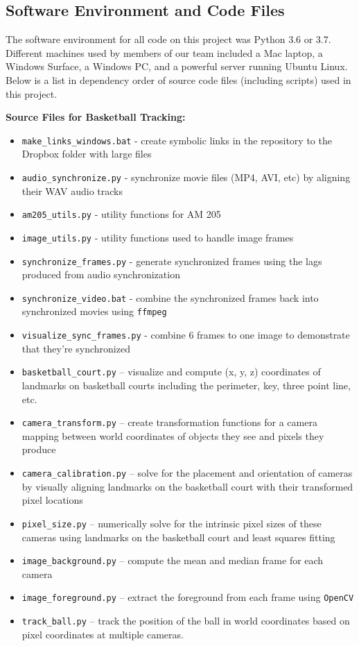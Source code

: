 \documentclass{article}
\begin{document}
\newpage
\subsection{Software Environment and Code Files}
The software environment for all code on this project was Python 3.6 or 3.7.
Different machines used by members of our team included a Mac laptop, a Windows Surface, 
a Windows PC, and a powerful server running Ubuntu Linux.  
Below is a list in dependency order of source code files (including scripts) used in this project.

\textbf{Source Files for Basketball Tracking:}
\begin{itemize}
\item \texttt{make\_links\_windows.bat} - create symbolic links in the repository to the Dropbox folder with large files
\item \texttt{audio\_synchronize.py} - synchronize movie files (MP4, AVI, etc) by aligning their WAV audio tracks
\item \texttt{am205\_utils.py} - utility functions for AM 205
\item \texttt{image\_utils.py} - utility functions used to handle image frames
\item \texttt{synchronize\_frames.py} - generate synchronized frames using the lags produced from audio synchronization
\item \texttt{synchronize\_video.bat} - combine the synchronized frames back into synchronized movies using \texttt{ffmpeg}
\item \texttt{visualize\_sync\_frames.py} - combine 6 frames to one image to demonstrate that they're synchronized
\item \texttt{basketball\_court.py} -- visualize and compute (x, y, z) coordinates of landmarks on 
basketball courts including the perimeter, key, three point line, etc.
\item \texttt{camera\_transform.py} -- create transformation functions for a camera mapping between world coordinates
of objects they see and pixels they produce
\item \texttt{camera\_calibration.py} -- solve for the placement and orientation of cameras by visually aligning landmarks
on the basketball court with their transformed pixel locations
\item \texttt{pixel\_size.py} -- numerically solve for the intrinsic pixel sizes of these cameras using landmarks
on the basketball court and least squares fitting
\item \texttt{image\_background.py} -- compute the mean and median frame for each camera
\item \texttt{image\_foreground.py} -- extract the foreground from each frame using \texttt{OpenCV}
\item \texttt{track\_ball.py} -- track the position of the ball in world coordinates based on pixel coordinates
at multiple cameras.
\end{itemize}
\end{document}
